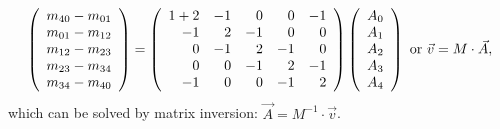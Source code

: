 \documentclass[12pt]{article}
\begin{document}
\begin{equation}
\left(\begin{array}{c}
m_{40} - m_{01} \\
m_{01} - m_{12} \\
m_{12} - m_{23} \\
m_{23} - m_{34} \\
m_{34} - m_{40} \\
\end{array}\right) = \left(\begin{array}{r r r r r}
1 + 2 & -1 & 0 & 0 & -1 \\
-1 & 2 & -1 & 0 & 0 \\
0 & -1 & 2 & -1 & 0 \\
0 & 0 & -1 & 2 & -1 \\
-1 & 0 & 0 & -1 & 2 \\
\end{array}\right) \left(\begin{array}{c}
A_0 \\
A_1 \\
A_2 \\
A_3 \\
A_4 \\
\end{array}\right) \mbox{ or } \vec{v} = M \cdot \vec{A},
\label{eqn:propagating_example3}
\end{equation}
which can be solved by matrix inversion: $\vec{A} = M^{-1} \cdot \vec{v}$.
\end{document}
